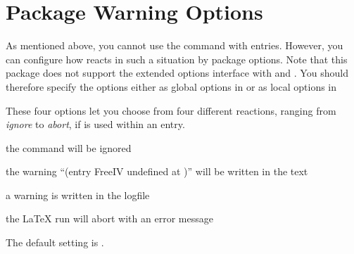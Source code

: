 \section{Package Warning Options}

As mentioned above, you cannot use the  command with
 entries. However, you can configure how
 reacts in such a situation by package options.
Note that this package does not support the extended
options interface with  and
. You should therefore specify the options
either as global options in  or as local
options in 


\begin{Declaration}
\end{Declaration}%
These four options let you choose from four different reactions, ranging
from \emph{ignore} to \emph{abort}, if  is used
within an  entry.

\begin{labeling}[~--]{}
\item[\Option{adrFreeIVempty}] 
        the command  will be ignored
\item[\Option{adrFreeIVshow}] 
        the warning ``(entry FreeIV undefined at )'' will be
        written in the text
\item[\Option{adrFreeIVwarn}]
        a warning is written in the logfile
\item[\Option{adrFreeIVstop}]
        the \LaTeX{} run will abort with an error message
\end{labeling}
The default setting is .%
\EndIndexGroup
%
\EndIndexGroup

\endinput

